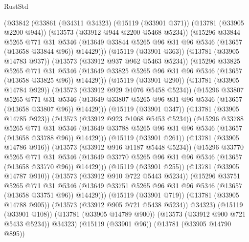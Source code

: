\begin{lexlean}{RustStd}
\begin{coremodule}
                (@33842
                  (@33861
                    (@34311 @34323)
                    (@15119 (@33901 @371))
                    (@13781 (@33905 @2200 @944))
                    (@13573 (@33912 @944 @2200 @5468 @5234))
                    (@15296
                      @33844
                      @5265
                      @771
                      @31
                      @5346
                      (@13649 @33844 @5265 @96 @31 @96 @5346 (@13657 (@13658 @33844 @96)) @14429)))
                  (@15119 (@33901 @363))
                  (@13781 (@33905 @14783 @937))
                  (@13573 (@33912 @937 @962 @5463 @5234))
                  (@15296
                    @33825
                    @5265
                    @771
                    @31
                    @5346
                    (@13649 @33825 @5265 @96 @31 @96 @5346 (@13657 (@13658 @33825 @96)) @14429)))
                (@15119 (@33901 @290))
                (@13781 (@33905 @14784 @929))
                (@13573 (@33912 @929 @1076 @5458 @5234))
                (@15296
                  @33807
                  @5265
                  @771
                  @31
                  @5346
                  (@13649 @33807 @5265 @96 @31 @96 @5346 (@13657 (@13658 @33807 @96)) @14429)))
              (@15119 (@33901 @347))
              (@13781 (@33905 @14785 @923))
              (@13573 (@33912 @923 @1068 @5453 @5234))
              (@15296
                @33788
                @5265
                @771
                @31
                @5346
                (@13649 @33788 @5265 @96 @31 @96 @5346 (@13657 (@13658 @33788 @96)) @14429)))
            (@15119 (@33901 @261))
            (@13781 (@33905 @14786 @916))
            (@13573 (@33912 @916 @1187 @5448 @5234))
            (@15296
              @33770
              @5265
              @771
              @31
              @5346
              (@13649 @33770 @5265 @96 @31 @96 @5346 (@13657 (@13658 @33770 @96)) @14429)))
          (@15119 (@33901 @255))
          (@13781 (@33905 @14787 @910))
          (@13573 (@33912 @910 @722 @5443 @5234))
          (@15296
            @33751
            @5265
            @771
            @31
            @5346
            (@13649 @33751 @5265 @96 @31 @96 @5346 (@13657 (@13658 @33751 @96)) @14429)))
        (@15119 (@33901 @719))
        (@13781 (@33905 @14788 @905))
        (@13573 (@33912 @905 @721 @5438 @5234))
        @34323)
      (@15119 (@33901 @108))
      (@13781 (@33905 @14789 @900))
      (@13573 (@33912 @900 @721 @5433 @5234))
      @34323)
    (@15119 (@33901 @96))
    (@13781 (@33905 @14790 @895))

\end{coremodule}
\end{lexlean}
